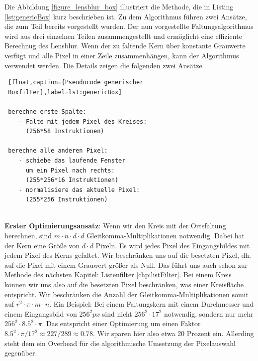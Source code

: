 \documentclass[a4paper,12pt]{article}
\begin{document}
Die Abbildung \ref{figure_lensblur_box} illustriert die Methode, die in
Listing \ref{lst:genericBox} kurz beschrieben ist. Zu dem Algorithmus führen
zwei Ansätze, die zum Teil bereits vorgestellt wurden. Der nun vorgestellte
Faltungsalgorithmus wird aus drei einzelnen Teilen zusammengestellt und
ermöglicht eine effiziente Berechnug des Lensblur. Wenn der zu faltende Kern
über konstante Grauwerte verfügt und alle Pixel in einer Zeile zusammenhängen,
kann der Algorithmus verwendet werden. Die Details zeigen die folgenden zwei
Ansätze.
\\

 \begin{lstlisting} [float,caption={Pseudocode generischer
 Boxfilter},label=lst:genericBox]

 berechne erste Spalte: 
 	- Falte mit jedem Pixel des Kreises: 
 	  (256*58 Instruktionen)
 
 berechne alle anderen Pixel:	
 	- schiebe das laufende Fenster 
 	  um ein Pixel nach rechts: 
 	  (255*256*16 Instruktionen)
 	- normalisiere das aktuelle Pixel: 
 	  (255*256 Instruktionen)
 
 \end{lstlisting}

\textbf{Erster Optimierungsansatz}: Wenn wir den Kreis mit der Ortsfaltung
berechnen, sind $m \cdot n \cdot d \cdot d$ Gleitkomma-Multiplikationen
notwendig.
Dabei hat der Kern eine Größe von $d \cdot d$ Pixeln. Es wird jedes Pixel des
Eingangsbildes mit jedem Pixel des Kerns gefaltet. Wir beschränken uns auf die besetzten Pixel,
dh. auf die Pixel mit einem Grauwert größer als Null. Das führt uns auch schon zur
Methode des nächsten Kapitel: Listenfilter \ref{chp:listFilter}. Bei einem Kreis
können wir uns also auf die besetzten Pixel beschränken, was einer Kreis\-fläche
entspricht. Wir beschränken die Anzahl der Gleitkomma-Multiplikationen somit auf
$r^{2}\cdot \pi \cdot m \cdot n$. Ein Beispiel: Bei einem Faltungskern mit einem
Durchmesser und einem Eingangsbild von $256^{2}px$ sind nicht $256^{2}
\cdot 17^{2}$ notwendig, sondern nur mehr $256^{2} \cdot 8.5^{2} \cdot \pi$. Das
entspricht einer Optimierung um einen Faktor $8.5^{2} \cdot \pi / 17^{2}
\approx 227/289 \approx 0.78 $. Wir sparen hier also etwa 20 Prozent ein. 
Allerding steht dem ein Overhead für die algorithmische Umsetzung der
Pixelauswahl gegenüber.
\end{document}
